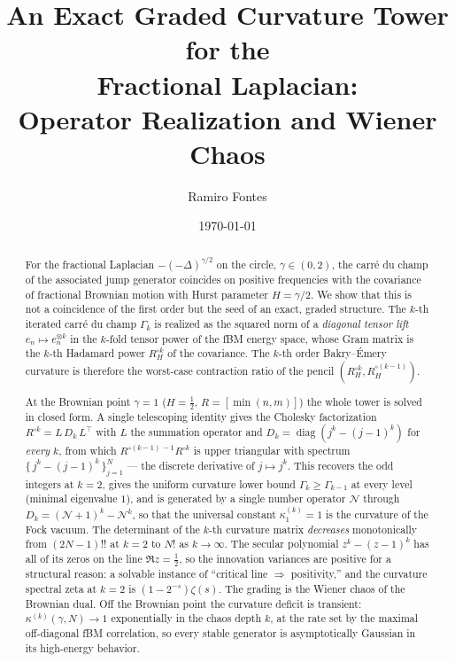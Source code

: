 \documentclass[11pt,reqno]{amsart}
\title[An exact graded curvature tower for the fractional Laplacian]{An Exact
Graded Curvature Tower for the\\ Fractional Laplacian:\\ Operator Realization
and Wiener Chaos}
\author{Ramiro Fontes}
\date{\today}
\theoremstyle{plain}
\theoremstyle{definition}
\newcommand{\Had}{\mathbin{\circ}}     %
\newcommand{\Num}{\mathcal{N}}         %
\DeclareMathOperator{\diag}{diag}
\newcommand{\Gam}{\Gamma}
\begin{document}
\begin{abstract}
For the fractional Laplacian $-(-\Delta)^{\gamma/2}$ on the circle, $\gamma\in(0,2)$,
the carr\'e du champ of the associated jump generator coincides on positive
frequencies with the covariance of fractional Brownian motion with Hurst
parameter $H=\gamma/2$. We show that this is not a coincidence of the first
order but the seed of an exact, graded structure. The $k$-th iterated carr\'e
du champ $\Gam_k$ is realized as the squared norm of a \emph{diagonal tensor
lift} $e_n\mapsto e_n^{\otimes k}$ in the $k$-fold tensor power of the
fBM energy space, whose Gram matrix is the $k$-th Hadamard power $R_H^{\Had k}$
of the covariance. The $k$-th order Bakry--\'Emery curvature is therefore the
worst-case contraction ratio of the pencil $(R_H^{\Had k},R_H^{\Had(k-1)})$.

At the Brownian point $\gamma=1$ ($H=\tfrac12$, $R=[\min(n,m)]$) the whole tower
is solved in closed form. A single telescoping identity gives the Cholesky
factorization $R^{\Had k}=L\,D_k\,L^{\top}$ with $L$ the summation operator and
$D_k=\diag(j^{k}-(j-1)^{k})$ for \emph{every} $k$, from which
$R^{\Had(k-1)\,-1}R^{\Had k}$ is upper triangular with spectrum
$\{\,j^{k}-(j-1)^{k}\,\}_{j=1}^{N}$ --- the discrete derivative of $j\mapsto j^{k}$.
This recovers the odd integers at $k=2$, gives the uniform curvature lower bound
$\Gam_k\ge\Gam_{k-1}$ at every level (minimal eigenvalue $1$), and is generated
by a single number operator $\Num$ through $D_k=(\Num+1)^{k}-\Num^{k}$, so that
the universal constant $\kappa^{(k)}_1=1$ is the curvature of the Fock vacuum.
The determinant of the $k$-th curvature matrix \emph{decreases} monotonically
from $(2N-1)!!$ at $k=2$ to $N!$ as $k\to\infty$. The secular polynomial
$z^{k}-(z-1)^{k}$ has all of its zeros on the line $\Re z=\tfrac12$, so the
innovation variances are positive for a structural reason: a solvable instance
of ``critical line $\Rightarrow$ positivity,'' and the curvature spectral zeta at
$k=2$ is $(1-2^{-s})\zeta(s)$. The grading is the Wiener chaos of the Brownian
dual. Off the Brownian point the curvature deficit is transient: $\kappa^{(k)}
(\gamma,N)\to1$ exponentially in the chaos depth $k$, at the rate set by the
maximal off-diagonal fBM correlation, so every stable generator is
asymptotically Gaussian in its high-energy behavior.
\end{abstract}

\maketitle
\end{document}
